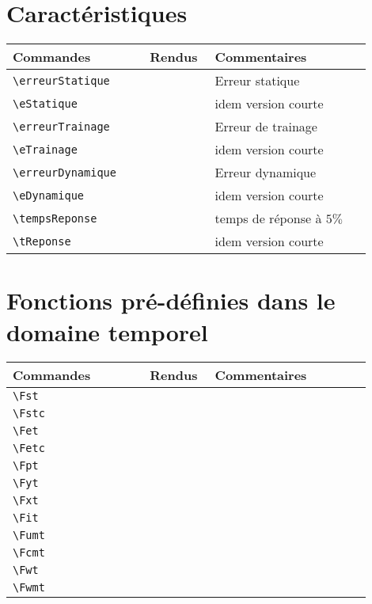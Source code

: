 \documentclass[a4paper,12pt]{article}
\begin{document}
	\section{Caractéristiques}

	\begin{tabular}{|p{0.35\linewidth}|p{0.15\linewidth}|p{0.4\linewidth}|}
		\hline
			\textbf{Commandes}&\textbf{Rendus}&\textbf{Commentaires}
		\\\hline\hline
			\verb!\erreurStatique!	&	\erreurStatique &	Erreur statique
		\\\hline
			\verb!\eStatique!	&	\eStatique &	idem version courte
		\\\hline
			\verb!\erreurTrainage!	&	\erreurTrainage &	Erreur de trainage
		\\\hline
			\verb!\eTrainage!	&	\eTrainage &	idem version courte
		\\\hline
			\verb!\erreurDynamique!	&	\erreurDynamique &	Erreur dynamique
		\\\hline
			\verb!\eDynamique!	&	\eDynamique &	idem version courte
		\\\hline
			\verb!\tempsReponse!	&	\tempsReponse & temps de réponse à $5\%$
		\\\hline
			\verb!\tReponse!	&	\tReponse &	idem version courte
		\\\hline
	\end{tabular}



	\section{Fonctions pré-définies dans le domaine temporel}
	\begin{tabular}{|p{0.35\linewidth}|p{0.15\linewidth}|p{0.4\linewidth}|}
		\hline
			\textbf{Commandes}&\textbf{Rendus}&\textbf{Commentaires}
		\\\hline\hline
			\verb!\Fst!	&	\Fst &	
		\\\hline
			\verb!\Fstc!	&	\Fstc &	
		\\\hline
			\verb!\Fet!	&	\Fet &	
		\\\hline
			\verb!\Fetc!	&	\Fetc &	
		\\\hline
			\verb!\Fpt!	&	\Fpt &	
		\\\hline
			\verb!\Fyt!	&	\Fyt &	
		\\\hline
			\verb!\Fxt!	&	\Fxt &	
		\\\hline
			\verb!\Fit!	&	\Fit &	
		\\\hline
			\verb!\Fumt!	&	\Fumt &	
		\\\hline
			\verb!\Fcmt!	&	\Fcmt &	
		\\\hline
			\verb!\Fwt!	&	\Fwt &	
		\\\hline
			\verb!\Fwmt!	&	\Fwmt &	
		\\\hline
	\end{tabular}
	
\end{document}
